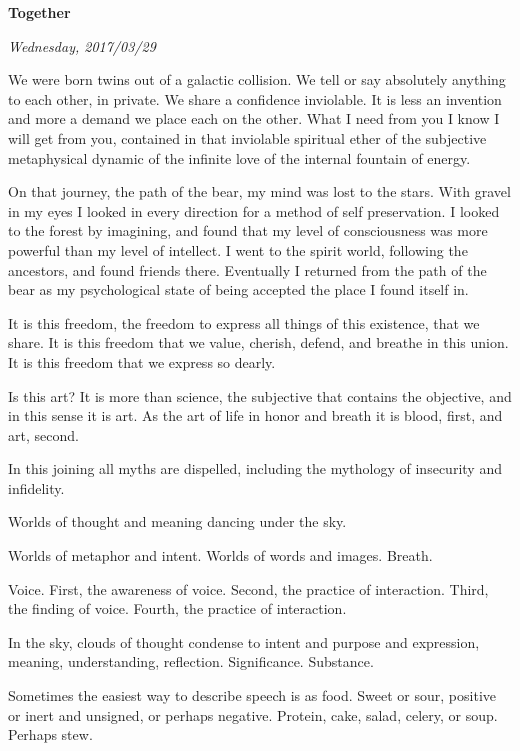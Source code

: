 

\centerline{\bf Together}
\centerline{\it Wednesday, 2017/03/29}



\vfill
\break

﻿We were born twins out of a galactic collision.  We tell or say
absolutely anything to each other, in private.  We share a confidence
inviolable.  It is less an invention and more a demand we place each
on the other.  What I need from you I know I will get from you,
contained in that inviolable spiritual ether of the subjective
metaphysical dynamic of the infinite love of the internal fountain of
energy.

\vfill
\break

﻿On that journey, the path of the bear, my mind was lost to the stars.
With gravel in my eyes I looked in every direction for a method of
self preservation.  I looked to the forest by imagining, and found
that my level of consciousness was more powerful than my level of
intellect.  I went to the spirit world, following the ancestors, and
found friends there.  Eventually I returned from the path of the bear
as my psychological state of being accepted the place I found itself
in.

\vfill
\break

﻿It is this freedom, the freedom to express all things of this
existence, that we share.  It is this freedom that we value, cherish,
defend, and breathe in this union.  It is this freedom that we express
so dearly.

Is this art?  It is more than science, the subjective that contains
the objective, and in this sense it is art.  As the art of life in
honor and breath it is blood, first, and art, second.

\vfill
\break

﻿In this joining all myths are dispelled, including the mythology of
insecurity and infidelity.

Worlds of thought and meaning dancing under the sky.

Worlds of metaphor and intent.  Worlds of words and images.  Breath.

Voice.  First, the awareness of voice.  Second, the practice of
interaction.  Third, the finding of voice.  \break Fourth, the practice of
interaction.

In the sky, clouds of thought condense to intent and purpose and
expression, meaning, understanding, reflection.  Significance.
Substance.

Sometimes the easiest way to describe speech is as food.  Sweet or
sour, positive or inert and unsigned, or perhaps negative.  Protein,
cake, salad, celery, or soup.  Perhaps stew.

